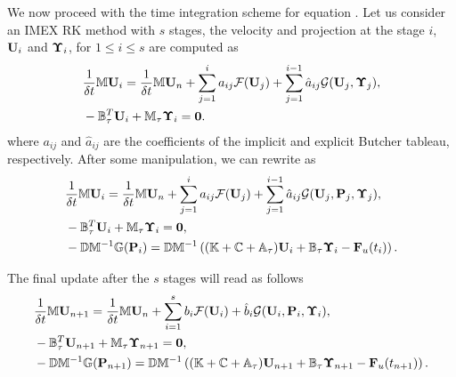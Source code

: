 We now proceed with the time integration scheme for equation . Let us consider an IMEX RK method with $s$ stages, the velocity and projection at the stage $i$, ${\bf U}_i$ and $\boldsymbol{\Upsilon}_i$, for $1\leq i\leq s$ are computed as
\begin{subequations}\label{eq-C7_SRK_ueta_RK}
\begin{align}
\label{eq-C7_SRK_u_RK}
&\frac{1}{\delta t}\mathbb{M}{\bf U}_i=\frac{1}{\delta t}\mathbb{M}{\bf U}_n+\sum_{j=1}^ia_{ij}\mathcal{F}({\bf U}_j)+\sum_{j=1}^{i-1}\hat{a}_{ij}\mathcal{G}({\bf U}_j,\boldsymbol{\Upsilon}_j),\\
\label{eq-C7_SRK_eta_RK}
&-\mathbb{B}_\tau^T{\bf U}_i+\mathbb{M}_\tau\boldsymbol{\Upsilon}_i=\mathbf{0}.
\end{align}
\end{subequations}
where $a_{ij}$ and $\hat{a}_{ij}$ are the coefficients of the implicit and explicit Butcher tableau, respectively.  
After some manipulation, we can rewrite  as
\begin{subequations}\label{eq-C7_SRK_upeta_RK}
\begin{align}
\label{eq-C7_SRK_upeta_RK_u}
&\frac{1}{\delta t}\mathbb{M}{\bf U}_i=\frac{1}{\delta t}\mathbb{M}{\bf U}_n+\sum_{j=1}^ia_{ij}\mathcal{F}({\bf U}_j)+\sum_{j=1}^{i-1}\hat{a}_{ij} \mathcal{G}({\bf U}_j,{\bf P}_j,\boldsymbol{\Upsilon}_j),\\
\label{eq-C7_SRK_upeta_RK_eta}
&-\mathbb{B}_\tau^T{\bf U}_i+\mathbb{M}_\tau\boldsymbol{\Upsilon}_i=\mathbf{0},\\
\label{eq-C7_SRK_upeta_RK_p}
&- \mathbb{D}\mathbb{M}^{-1}\mathbb{G} ({\bf P}_i)=\mathbb{D}\mathbb{M}^{-1}\left((\mathbb{K}+\mathbb{C}+\mathbb{A}_\tau){\bf U}_i+\mathbb{B}_\tau\boldsymbol{\Upsilon}_i-{\bf F}_u(t_i)\right).
\end{align}
\end{subequations}

The final update after the $s$ stages will read as follows
\begin{subequations}\label{eq-C7_SRK_upeta_RK_n+1}
\begin{align}
\label{eq-C7_SRK_upeta_RK_u_n+1}
&\frac{1}{\delta t}\mathbb{M}{\bf U}_{n+1}=\frac{1}{\delta t}\mathbb{M}{\bf U}_n+\sum_{i=1}^sb_i\mathcal{F}({\bf U}_i)+\hat{b}_{i} \mathcal{G}({\bf U}_i,{\bf P}_i,\boldsymbol{\Upsilon}_i),\\
\label{eq-C7_SRK_upeta_RK_eta_n+1}
&-\mathbb{B}_\tau^T{\bf U}_{n+1}+\mathbb{M}_\tau\boldsymbol{\Upsilon}_{n+1}=\mathbf{0},\\
\label{eq-C7_SRK_upeta_RK_p_n+1}
&- \mathbb{D}\mathbb{M}^{-1}\mathbb{G} ({\bf P}_{n+1})=\mathbb{D}\mathbb{M}^{-1}\left((\mathbb{K}+\mathbb{C}+\mathbb{A}_\tau){\bf U}_{n+1}+\mathbb{B}_\tau\boldsymbol{\Upsilon}_{n+1}-{\bf F}_u(t_{n+1})\right).
\end{align}
\end{subequations}

